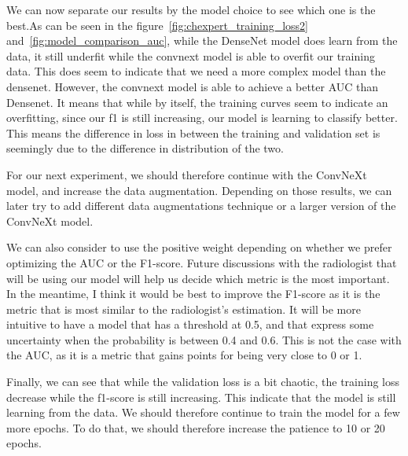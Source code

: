 \documentclass[11pt]{article}
\begin{document}
                We can now separate our results by the model choice to see which one is the best.As can be seen in
                the figure~\ref{fig:chexpert_training_loss2} and~\ref{fig:model_comparison_auc}, while the DenseNet model does
                learn from the data, it still underfit while the convnext model is able to overfit our training data.
                This does seem to indicate that we need a more complex model than the densenet.
                However, the convnext model is able to achieve a better AUC than Densenet. It means that while by itself, the training curves seem
                to indicate an overfitting, since our f1 is still increasing, our model is learning to classify better. This means the difference in loss in between the training
                and validation set is seemingly due to the difference in distribution of the two.

                For our next experiment, we should therefore continue with the ConvNeXt model, and increase the data
                augmentation. Depending on those results, we can later try to add different data augmentations
                technique or a larger version of the ConvNeXt model.

                We can also consider to use the positive weight depending on whether we prefer optimizing the AUC or the F1-score. Future discussions with the radiologist
                that will be using our model will help us decide which metric is the most important. In the meantime, I think it would be best to improve the F1-score as
                it is the metric that is most similar to the radiologist's estimation. It will be more intuitive to have a model that has a threshold at 0.5, and that express
                some uncertainty when the probability is between 0.4 and 0.6. This is not the case with the AUC, as it is a metric that gains points for being very close to 0 or 1.

                Finally, we can see that while the validation loss is a bit chaotic, the training loss decrease while the f1-score is still increasing. This indicate
                that the model is still learning from the data. We should therefore continue to train the model for a few more epochs. To do that, we should therefore increase the patience
                to 10 or 20 epochs.
\end{document}
